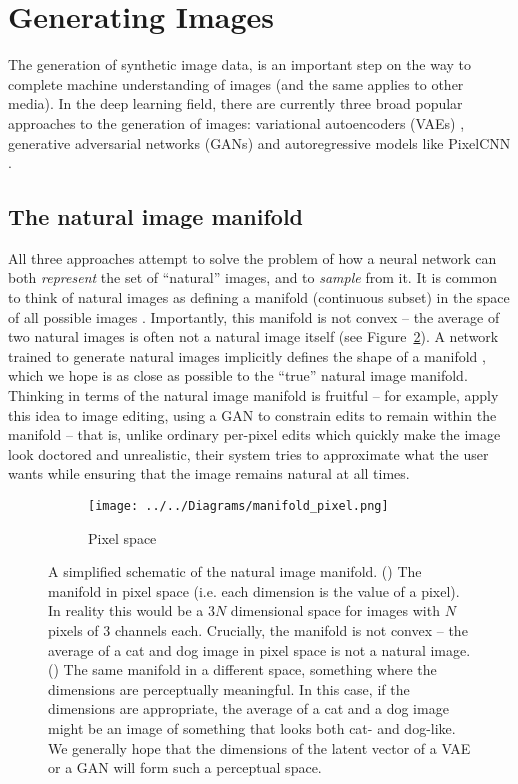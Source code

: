 \documentclass[11pt, a4paper, openany]{book}
\newcommand{\nquote}[1]{``{#1}''}
\begin{document}
\section{Generating Images}

The generation of synthetic image data, is an important step on the way to complete machine understanding of images (and the same applies to other media). In the deep learning field, there are currently three broad popular approaches to the generation of images: variational autoencoders (VAEs) \citep{vae}, generative adversarial networks (GANs) \citep{gan} and autoregressive models like PixelCNN \citep{pixelcnn2}.

\subsection{The natural image manifold}

All three approaches attempt to solve the problem of how a neural network can both \emph{represent} the set of \nquote{natural} images, and to \emph{sample} from it. It is common to think of natural images as defining a manifold (continuous subset) in the space of all possible images \citep{manifoldmanipulation,imageinpainting,manifoldmixup}. Importantly, this manifold is not convex -- the average of two natural images is often not a natural image itself (see Figure~\ref{manifold}). A network trained to generate natural images implicitly defines the shape of a manifold \citep{manifoldmanipulation}, which we hope is as close as possible to the \nquote{true} natural image manifold. Thinking in terms of the natural image manifold is fruitful -- for example, \citet{manifoldmanipulation} apply this idea to image editing, using a GAN to constrain edits to remain within the manifold -- that is, unlike ordinary per-pixel edits which quickly make the image look doctored and unrealistic, their system tries to approximate what the user wants while ensuring that the image remains natural at all times.

\begin{figure}
	\centering	
    \begin{subfigure}{\columnwidth}
        \centering
        \caption{Pixel space}
        \texttt{[image: ../../Diagrams/manifold\_pixel.png]}
        \label{manifold:pixel}
    \end{subfigure}
    \caption[Simplified schematic of the natural image manifold]{A simplified schematic of the natural image manifold. () The manifold in pixel space (i.e. each dimension is the value of a pixel). In reality this would be a $3N$ dimensional space for images with $N$ pixels of 3 channels each. Crucially, the manifold is not convex -- the average of a cat and dog image in pixel space is not a natural image. () The same manifold in a different space, something where the dimensions are perceptually meaningful. In this case, if the dimensions are appropriate, the average of a cat and a dog image might be an image of something that looks both cat- and dog-like. We generally hope that the dimensions of the latent vector of a VAE or a GAN will form such a perceptual space.}
    \label{manifold}
\end{figure}
    
\end{document}
